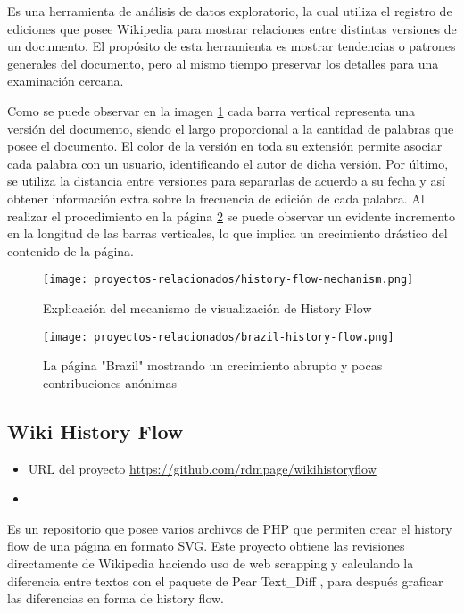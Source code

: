 Es una herramienta de análisis de datos exploratorio, la cual utiliza el registro de ediciones que posee Wikipedia para mostrar relaciones entre distintas versiones de un documento. El propósito de esta herramienta es mostrar tendencias o patrones generales del documento, pero al mismo tiempo preservar los detalles para una examinación cercana.

Como se puede observar en la imagen \ref*{fig:history-flow-mechanism} cada barra vertical representa una versión del documento, siendo el largo proporcional a la cantidad de palabras que posee el documento. El color de la versión en toda su extensión permite asociar cada palabra con un usuario, identificando el autor de dicha versión. Por último, se utiliza la distancia entre versiones para separarlas de acuerdo a su fecha y así obtener información extra sobre la frecuencia de edición de cada palabra. Al realizar el procedimiento en la página  \ref*{fig:brazil-history-flow} se puede observar un evidente incremento en la longitud de las barras verticales, lo que implica un crecimiento drástico del contenido de la página.

\begin{figure}[H]
    \texttt{[image: proyectos-relacionados/history-flow-mechanism.png]}
    \caption{Explicación del mecanismo de visualización de History Flow}
    \label{fig:history-flow-mechanism}
\end{figure}

\begin{figure}[H]
    \texttt{[image: proyectos-relacionados/brazil-history-flow.png]}
    \caption{La página "Brazil" mostrando un crecimiento abrupto y pocas contribuciones anónimas}
    \label{fig:brazil-history-flow}
\end{figure}

\subsection{Wiki History Flow}

\begin{itemize}
    \item URL del proyecto \url{https://github.com/rdmpage/wikihistoryflow}
    \item
\end{itemize}

Es un repositorio que posee varios archivos de PHP que permiten crear el history flow de una página en formato SVG. Este proyecto obtiene las revisiones directamente de Wikipedia haciendo uso de web scrapping y calculando la diferencia entre textos con el paquete de Pear Text\_Diff \cite{pear_text_diff}, para después graficar las diferencias en forma de history flow.

